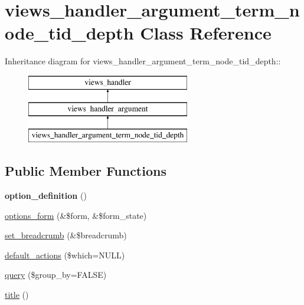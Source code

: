 \hypertarget{classviews__handler__argument__term__node__tid__depth}{
\section{views\_\-handler\_\-argument\_\-term\_\-node\_\-tid\_\-depth Class Reference}
\label{classviews__handler__argument__term__node__tid__depth}
}
Inheritance diagram for views\_\-handler\_\-argument\_\-term\_\-node\_\-tid\_\-depth::\begin{figure}[H]
\begin{center}
\leavevmode
\includegraphics[height=3cm]{classviews__handler__argument__term__node__tid__depth}
\end{center}
\end{figure}
\subsection*{Public Member Functions}
\begin{DoxyCompactItemize}
\item 
\hypertarget{classviews__handler__argument__term__node__tid__depth_ae285fe11521bfb9a6cd4f79b498a28a7}{
{\bfseries option\_\-definition} ()}
\label{classviews__handler__argument__term__node__tid__depth_ae285fe11521bfb9a6cd4f79b498a28a7}

\item 
\hyperlink{classviews__handler__argument__term__node__tid__depth_adb15b091303182e330a162d384676e50}{options\_\-form} (\&\$form, \&\$form\_\-state)
\item 
\hyperlink{classviews__handler__argument__term__node__tid__depth_a4cbf578a06b12655b9a5aa8fcee4097d}{set\_\-breadcrumb} (\&\$breadcrumb)
\item 
\hyperlink{classviews__handler__argument__term__node__tid__depth_a507f5facd0421728d2d0a5f350839dfc}{default\_\-actions} (\$which=NULL)
\item 
\hyperlink{classviews__handler__argument__term__node__tid__depth_a0e537f160d9c8da21a844133ded89672}{query} (\$group\_\-by=FALSE)
\item 
\hyperlink{classviews__handler__argument__term__node__tid__depth_ad5a2ca190b4b164a810f84f808faa586}{title} ()
\end{DoxyCompactItemize}


